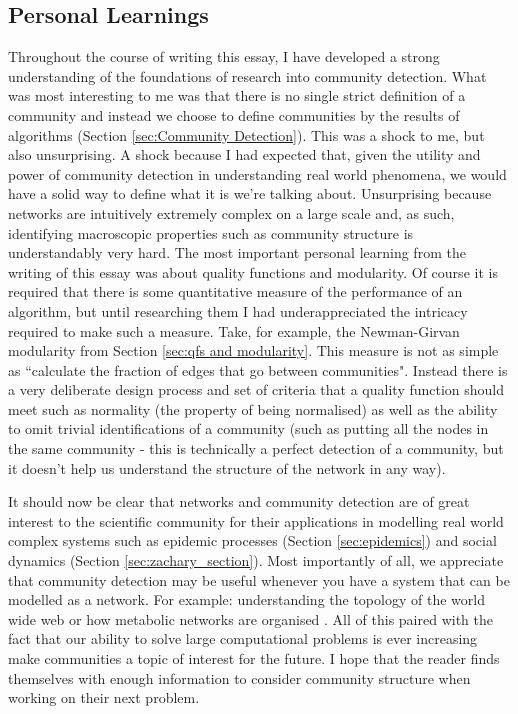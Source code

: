 \subsection{Personal Learnings}
Throughout the course of writing this essay, I have developed a strong understanding of the foundations of research into community detection. What was most interesting to me was that there is no single strict definition of a community and instead we choose to define communities by the results of algorithms (Section \ref{sec:Community Detection}). This was a shock to me, but also unsurprising. A shock because I had expected that, given the utility and power of community detection in understanding real world phenomena, we would have a solid way to define what it is we're talking about. Unsurprising because networks are intuitively extremely complex on a large scale and, as such, identifying macroscopic properties such as community structure is understandably very hard. The most important personal learning from the writing of this essay was about quality functions and modularity. Of course it is required that there is some quantitative measure of the performance of an algorithm, but until researching them I had underappreciated the intricacy required to make such a measure. Take, for example, the Newman-Girvan modularity from Section \ref{sec:qfs and modularity}. This measure is not as simple as ``calculate the fraction of edges that go between communities". Instead there is a very deliberate design process and set of criteria that a quality function should meet such as normality (the property of being normalised) as well as the ability to omit trivial identifications of a community (such as putting all the nodes in the same community - this is technically a perfect detection of a community, but it doesn't help us understand the structure of the network in any way).

It should now be clear that networks and community detection are of great interest to the scientific community for their applications in modelling real world complex systems such as epidemic processes (Section \ref{sec:epidemics}) and social dynamics (Section \ref{sec:zachary_section}). Most importantly of all, we appreciate that community detection may be useful whenever you have a system that can be modelled as a network. For example: understanding the topology of the world wide web \cite{BARABASI200069} or how metabolic networks are organised \cite{Jeong2000}. All of this paired with the fact that our ability to solve large computational problems is ever increasing make communities a topic of interest for the future. I hope that the reader finds themselves with enough information to consider community structure when working on their next problem.
